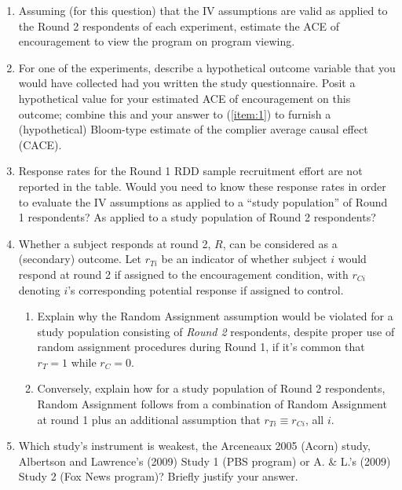 \documentclass{article}
\begin{document}
\begin{enumerate}
\item \label{item:1}Assuming (for this question) that the IV assumptions are valid as applied to the Round 2 respondents of each experiment, estimate the ACE of encouragement to view the program on program viewing.
\item For one of the experiments, describe a hypothetical outcome variable that you would have collected had you written the study questionnaire. Posit a hypothetical value for your estimated ACE of encouragement on this outcome; combine this and your answer to (\ref{item:1}) to furnish a (hypothetical) Bloom-type estimate of the complier average causal effect (CACE).  
\item Response rates for the Round 1 RDD sample recruitment effort are not reported in the table. Would you need to know these response rates in order to evaluate the IV assumptions as applied to a ``study population'' of Round 1 respondents?  As applied to a study population of Round 2 respondents? 
\item Whether a subject responds at round 2, $R$, can be considered as a (secondary) outcome. Let $r_{Ti}$ be an indicator of whether subject $i$ would respond at round 2 if assigned to the encouragement condition, with $r_{Ci}$ denoting $i$'s corresponding potential response if assigned to control.
  \begin{enumerate}
  \item Explain why the Random Assignment assumption would be violated for a study population consisting of \textit{Round 2} respondents, despite proper use of random assignment procedures during Round 1, if it's common that $r_{T}=1$ while $r_{C}=0$.
  \item Conversely, explain how for a study population of Round 2 respondents, Random Assignment follows from a combination of Random Assignment at round 1 plus an additional assumption that $r_{Ti} \equiv r_{Ci}$, all $i$. 
  \end{enumerate}
\item Which study's instrument is weakest, the Arceneaux 2005 (Acorn) study, Albertson and Lawrence's (2009) Study 1 (PBS program) or A. \& L.'s (2009) Study 2 (Fox News program)? Briefly justify your answer.
\end{enumerate}
\end{document}

